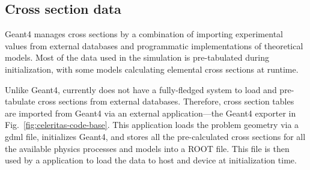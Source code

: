 \subsection{Cross section data}

Geant4 manages cross sections by a combination of importing experimental values
from external databases and programmatic implementations of theoretical models.
Most of the data used in the simulation is pre-tabulated during initialization,
with some models calculating elemental cross sections at runtime.

Unlike Geant4, \celeritas currently does not have a fully-fledged system to load
and pre-tabulate cross sections from external databases. Therefore, cross
section tables are imported from Geant4 via an external application---the Geant4
exporter in Fig.~\ref{fig:celeritas-code-base}. This application loads the
problem geometry via a \acs{gdml} file, initializes Geant4, and stores all the
pre-calculated cross sections for all the available physics processes and models
into a ROOT file. This file is then used by a \celeritas application to load the
data to host and device at initialization time.
